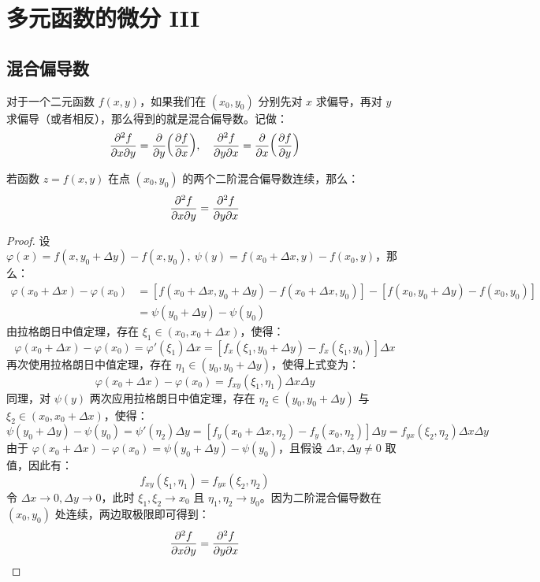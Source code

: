 \section{多元函数的微分 III}

\subsection{混合偏导数}

对于一个二元函数 $f(x, y)$，如果我们在 $(x_0, y_0)$ 分别先对 $x$ 求偏导，再对 $y$ 求偏导（或者相反），那么得到的就是混合偏导数。记做：
$$
\pdv{^2 f}{x \partial y} = \pdv{y}(\pdv{f}{x}),\quad \pdv{^2 f}{y \partial x} = \pdv{x}(\pdv{f}{y})
$$

\begin{theorem}
    若函数 $z = f(x, y)$ 在点 $(x_0, y_0)$ 的两个二阶混合偏导数连续，那么：
    $$
    \pdv{^2 f}{x \partial y} = \pdv{^2 f}{y \partial x}
    $$
    \begin{proof}
        设 $\varphi(x) = f(x, y_0 + \Delta y) - f(x, y_0),\ \psi(y) = f(x_0 + \Delta x, y) - f(x_0, y)$，那么：
        $$
        \begin{aligned}
            \varphi(x_0 + \Delta x) - \varphi(x_0) &= [f(x_0 + \Delta x, y_0 + \Delta y) - f(x_0 + \Delta x, y_0)] - [f(x_0, y_0 + \Delta y) - f(x_0, y_0)] \\
            &= \psi(y_0 + \Delta y) - \psi(y_0)
        \end{aligned}
        $$
        由拉格朗日中值定理，存在 $\xi_1 \in (x_0, x_0 + \Delta x)$，使得：
        $$
        \varphi(x_0 + \Delta x) - \varphi(x_0) = \varphi'(\xi_1) \Delta x = [f_x(\xi_1, y_0 + \Delta y) - f_x(\xi_1, y_0)] \Delta x
        $$
        再次使用拉格朗日中值定理，存在 $\eta_1 \in (y_0, y_0 + \Delta y)$，使得上式变为：
        $$
        \varphi(x_0 + \Delta x) - \varphi(x_0) = f_{xy}(\xi_1, \eta_1) \Delta x \Delta y
        $$
        同理，对 $\psi(y)$ 两次应用拉格朗日中值定理，存在 $\eta_2 \in (y_0, y_0 + \Delta y)$ 与 $\xi_2 \in (x_0, x_0 + \Delta x)$，使得：
        $$
        \psi(y_0 + \Delta y) - \psi(y_0) = \psi'(\eta_2) \Delta y = [f_y(x_0 + \Delta x, \eta_2) - f_y(x_0, \eta_2)] \Delta y = f_{yx}(\xi_2, \eta_2) \Delta x \Delta y
        $$
        由于 $\varphi(x_0 + \Delta x) - \varphi(x_0) = \psi(y_0 + \Delta y) - \psi(y_0)$，且假设 $\Delta x, \Delta y \neq 0$ 取值，因此有：
        $$
        f_{xy}(\xi_1, \eta_1) = f_{yx}(\xi_2, \eta_2)
        $$
        令 $\Delta x \to 0, \Delta y \to 0$，此时 $\xi_1, \xi_2 \to x_0$ 且 $\eta_1, \eta_2 \to y_0$。因为二阶混合偏导数在 $(x_0, y_0)$ 处连续，两边取极限即可得到：
        $$
        \pdv{^2 f}{x \partial y} = \pdv{^2 f}{y \partial x}
        $$
    \end{proof}
\end{theorem}